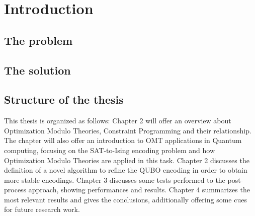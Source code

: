 \chapter{Introduction}
\label{cha:intro}

\section{The problem}

\section{The solution}

\section{Structure of the thesis}

This thesis is organized as follows: Chapter 2 will offer an overview about Optimization Modulo Theories, Constraint Programming and their relationship. The chapter will also offer an introduction to OMT applications in Quantum computing, focusing on the SAT-to-Ising encoding problem and how Optimization Modulo Theories are applied in this task. Chapter 2 discusses the definition of a novel algorithm to refine the QUBO encoding in order to obtain more stable encodings. Chapter 3 discusses some tests performed to the post-process approach, showing performances and results. Chapter 4 summarizes the most relevant results and gives the conclusions, additionally offering some cues for future research work.

\newpage